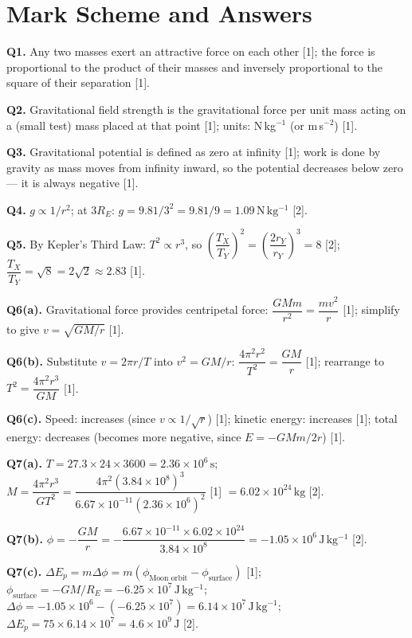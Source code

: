 \newpage
\section{Mark Scheme and Answers}

\begin{markbox}
\textbf{Q1.} Any two masses exert an attractive force on each other [1]; the force is
proportional to the product of their masses and inversely proportional to the square
of their separation [1].

\medskip
\textbf{Q2.} Gravitational field strength is the gravitational force per unit mass
acting on a (small test) mass placed at that point [1]; units: N\,kg$^{-1}$
(or m\,s$^{-2}$) [1].

\medskip
\textbf{Q3.} Gravitational potential is defined as zero at infinity [1]; work is done
by gravity as mass moves from infinity inward, so the potential decreases below zero —
it is always negative [1].

\medskip
\textbf{Q4.} $g \propto 1/r^2$; at $3R_E$:
$g = 9.81/3^2 = 9.81/9 = 1.09\,\mathrm{N\,kg^{-1}}$ [2].

\medskip
\textbf{Q5.} By Kepler's Third Law: $T^2 \propto r^3$, so
$\left(\dfrac{T_X}{T_Y}\right)^2 = \left(\dfrac{2r_Y}{r_Y}\right)^3 = 8$ [2];\quad
$\dfrac{T_X}{T_Y} = \sqrt{8} = 2\sqrt{2} \approx 2.83$ [1].

\medskip
\textbf{Q6(a).} Gravitational force provides centripetal force:
$\dfrac{GMm}{r^2} = \dfrac{mv^2}{r}$ [1]; simplify to give $v = \sqrt{GM/r}$ [1].

\textbf{Q6(b).} Substitute $v = 2\pi r/T$ into $v^2 = GM/r$:
$\dfrac{4\pi^2 r^2}{T^2} = \dfrac{GM}{r}$ [1];
rearrange to $T^2 = \dfrac{4\pi^2 r^3}{GM}$ [1].

\textbf{Q6(c).} Speed: increases (since $v \propto 1/\sqrt{r}$) [1]; kinetic energy:
increases [1]; total energy: decreases (becomes more negative, since
$E = -GMm/2r$) [1].

\medskip
\textbf{Q7(a).}
$T = 27.3 \times 24 \times 3600 = 2.36\times10^6\,\mathrm{s}$;\quad
$M = \dfrac{4\pi^2 r^3}{GT^2}
   = \dfrac{4\pi^2 (3.84\times10^8)^3}{6.67\times10^{-11}(2.36\times10^6)^2}$
[1] $= 6.02\times10^{24}\,\mathrm{kg}$ [2].

\textbf{Q7(b).}
$\phi = -\dfrac{GM}{r}
      = -\dfrac{6.67\times10^{-11} \times 6.02\times10^{24}}{3.84\times10^8}
      = -1.05\times10^6\,\mathrm{J\,kg^{-1}}$ [2].

\textbf{Q7(c).}
$\Delta E_p = m\Delta\phi = m(\phi_{\text{Moon orbit}} - \phi_{\text{surface}})$ [1];\quad
$\phi_{\text{surface}} = -GM/R_E = -6.25\times10^7\,\mathrm{J\,kg^{-1}}$;\quad
$\Delta\phi = -1.05\times10^6 - (-6.25\times10^7) = 6.14\times10^7\,\mathrm{J\,kg^{-1}}$;\quad
$\Delta E_p = 75 \times 6.14\times10^7 = 4.6\times10^9\,\mathrm{J}$ [2].
\end{markbox}

